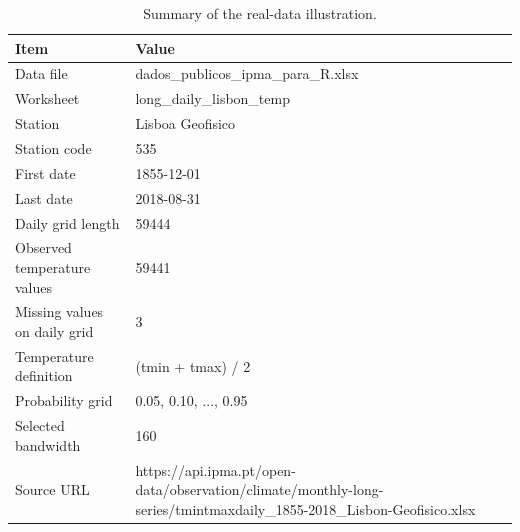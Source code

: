\begin{table}[!htbp]
\centering
\small
\caption{Summary of the real-data illustration.}
\label{tab:real-data-summary}
\begin{tabular}{ll}
\toprule
Item & Value
 \\
\midrule
Data file & dados\_publicos\_ipma\_para\_R.xlsx
 \\
Worksheet & long\_daily\_lisbon\_temp
 \\
Station & Lisboa Geofisico
 \\
Station code & 535
 \\
First date & 1855-12-01
 \\
Last date & 2018-08-31
 \\
Daily grid length & 59444
 \\
Observed temperature values & 59441
 \\
Missing values on daily grid & 3
 \\
Temperature definition & (tmin + tmax) / 2
 \\
Probability grid & 0.05, 0.10, ..., 0.95
 \\
Selected bandwidth & 160
 \\
Source URL & https://api.ipma.pt/open-data/observation/climate/monthly-long-series/tmintmaxdaily\_1855-2018\_Lisbon-Geofisico.xlsx
 \\
\bottomrule
\end{tabular}
\end{table}

